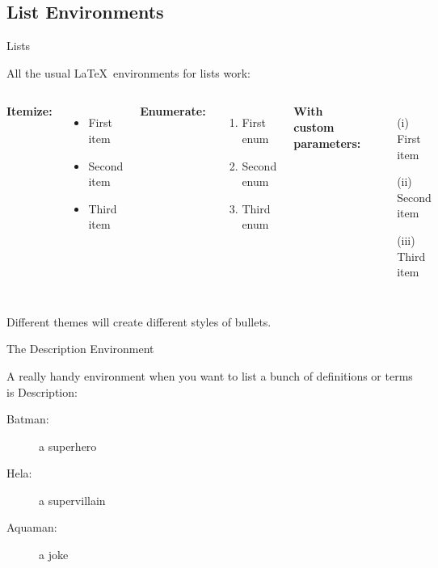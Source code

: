 \documentclass{beamer}
\begin{document}
\subsection{List Environments}

\begin{frame}{Lists}

	All the usual \LaTeX\ environments for lists work:		%
	
	\vfill
	
	\begin{columns}[c]							%
		\textbf{Itemize:}
		\begin{itemize}
			\item First item
			\item Second item
			\item Third item
		\end{itemize}
		
		\textbf{Enumerate:}
		\begin{enumerate}
			\item First enum
			\item Second enum
			\item Third enum
		\end{enumerate}
		
		\textbf{With custom parameters:}
		\begin{enumerate}						%
			\item[(i)] First item
			\item[(ii)] Second item
			\item[(iii)] Third item
		\end{enumerate}
	\end{columns}
	
	\vfill
	
	Different themes will create different styles of bullets.
	
\end{frame}


\begin{frame}{The Description Environment}
	
	A really handy environment when you want to list a bunch of definitions or terms is \alert{Description}:
	
	\begin{description}
		\item[Batman:] a superhero
		\item[Hela:] a supervillain
		\item[Aquaman:] a joke
	\end{description}
	
\end{frame}
\end{document}
